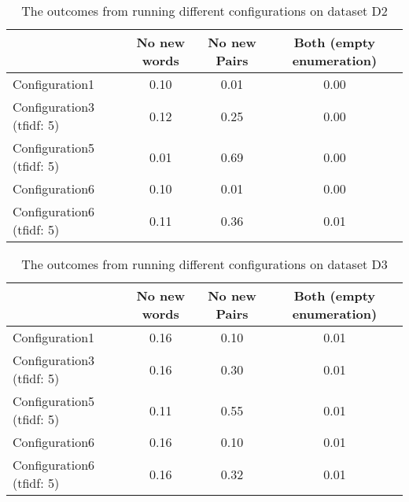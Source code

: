\begin{center}
\begin{table}
  \begin{tabular}{|l|c|c|c|}
    \hline
    &  No new words & No new Pairs & Both (empty enumeration) \\ \hline
    Configuration1                    & 0.10  & 0.01  & 0.00 \\ \hline
    Configuration3 (tfidf: 5)         & 0.12  & 0.25  & 0.00 \\ \hline
    Configuration5 (tfidf: 5)         & 0.01  & 0.69  & 0.00 \\ \hline
    Configuration6                    & 0.10  & 0.01  & 0.00 \\ \hline
    Configuration6 (tfidf: 5)         & 0.11  & 0.36  & 0.01 \\ \hline
  \end{tabular}
  \caption{The outcomes from running different configurations on dataset D2}
  \label{tab:d2}
\end{table}
\end{center}

\begin{center}
\begin{table}
  \begin{tabular}{|l|c|c|c|}
    \hline
    &  No new words & No new Pairs & Both (empty enumeration) \\ \hline
    Configuration1                    & 0.16  & 0.10  & 0.01 \\ \hline
    Configuration3 (tfidf: 5)         & 0.16  & 0.30  & 0.01 \\ \hline
    Configuration5 (tfidf: 5)         & 0.11  & 0.55  & 0.01 \\ \hline
    Configuration6                    & 0.16  & 0.10  & 0.01 \\ \hline
    Configuration6 (tfidf: 5)         & 0.16  & 0.32  & 0.01 \\ \hline
  \end{tabular}
  \caption{The outcomes from running different configurations on dataset D3}
  \label{tab:d3}
\end{table}
\end{center}

